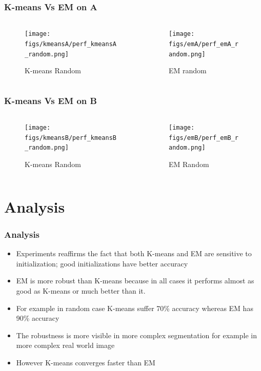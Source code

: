 \documentclass[11pt]{beamer}
\begin{document}
\begin{frame}
\frametitle{K-means Vs EM on A}
\begin{columns}
\begin{column}{.3\textwidth}
\begin{figure}
  \texttt{[image: figs/kmeansA/perf\_kmeansA\_random.png]}
  \caption{K-means Random}
\end{figure}
\end{column}
\begin{column}{.3\textwidth}
\begin{figure}
  \texttt{[image: figs/emA/perf\_emA\_random.png]}
  \caption{EM random}
\end{figure}
\end{column}
\end{columns}
\end{frame}

\begin{frame}
\frametitle{K-means Vs EM on B}
\begin{columns}
\begin{column}{.3\textwidth}
\begin{figure}
  \texttt{[image: figs/kmeansB/perf\_kmeansB\_random.png]}
  \caption{K-means Random}
\end{figure}
\end{column}
\begin{column}{.3\textwidth}
\begin{figure}
  \texttt{[image: figs/emB/perf\_emB\_random.png]}
  \caption{EM Random}
\end{figure}
\end{column}
\end{columns}
\end{frame}

\section{Analysis}
\begin{frame}
\frametitle{Analysis}
\begin{itemize}
  \item Experiments reaffirms the fact that both K-means and EM are sensitive to initialization; good initializations have better accuracy 
  \item EM is more robust than K-means because in all cases it performs almost as good as K-means or much better than it.
  \item For example in random case K-means suffer 70\% accuracy whereas EM has 90\% accuracy
  \item The robustness is more visible in more complex segmentation for example in more complex real world image
  \item However K-means converges faster than EM
\end{itemize}
\end{frame}
\end{document}
